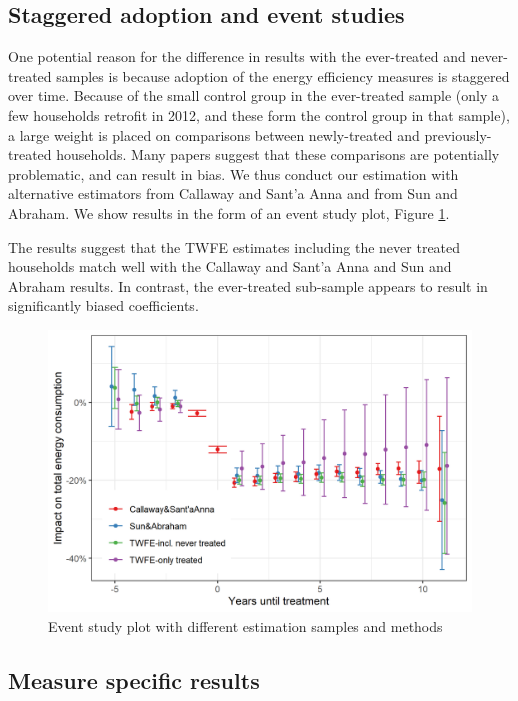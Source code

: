 \documentclass{article}
\begin{document}


\subsection{Staggered adoption and event studies}
One potential reason for the difference in results with the ever-treated and never-treated samples is because adoption of the energy efficiency measures is staggered over time. Because of the small control group in the ever-treated sample (only a few households retrofit in 2012, and these form the control group in that sample), a large weight is placed on comparisons between newly-treated and previously-treated households. Many papers suggest that these comparisons are potentially problematic, and can result in bias.  We thus conduct our estimation with alternative estimators from Callaway and Sant'a Anna and from Sun and Abraham.  We show results in the form of an event study plot, Figure \ref{fig_esplot}.

The results suggest that the TWFE estimates including the never treated households match well with the Callaway and Sant'a Anna and Sun and Abraham results.  In contrast, the ever-treated sub-sample appears to result in significantly biased coefficients.

\begin{figure}
	\includegraphics{../output_figures_tables/event_study_plot}
	\caption{Event study plot with different estimation samples and methods}\label{fig_esplot}
\end{figure}


\subsection{Measure specific results}
\end{document}
